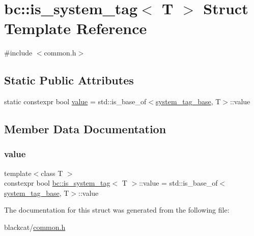 \hypertarget{structbc_1_1is__system__tag}{}\section{bc\+:\+:is\+\_\+system\+\_\+tag$<$ T $>$ Struct Template Reference}
\label{structbc_1_1is__system__tag}


{\ttfamily \#include $<$common.\+h$>$}

\subsection*{Static Public Attributes}
\begin{DoxyCompactItemize}
\item 
static constexpr bool \hyperlink{structbc_1_1is__system__tag_a09c277f4d0115742dbaf6cb4c6e305a8}{value} = std\+::is\+\_\+base\+\_\+of$<$\hyperlink{classbc_1_1system__tag__base}{system\+\_\+tag\+\_\+base}, T$>$\+::value
\end{DoxyCompactItemize}


\subsection{Member Data Documentation}
\mbox{\label{structbc_1_1is__system__tag_a09c277f4d0115742dbaf6cb4c6e305a8}} 
\subsubsection{\texorpdfstring{value}{value}}
{\footnotesize\ttfamily template$<$class T $>$ \\
constexpr bool \hyperlink{structbc_1_1is__system__tag}{bc\+::is\+\_\+system\+\_\+tag}$<$ T $>$\+::value = std\+::is\+\_\+base\+\_\+of$<$\hyperlink{classbc_1_1system__tag__base}{system\+\_\+tag\+\_\+base}, T$>$\+::value\hspace{0.3cm}{\ttfamily [static]}}



The documentation for this struct was generated from the following file\+:\begin{DoxyCompactItemize}
\item 
blackcat/\hyperlink{common_8h}{common.\+h}\end{DoxyCompactItemize}
